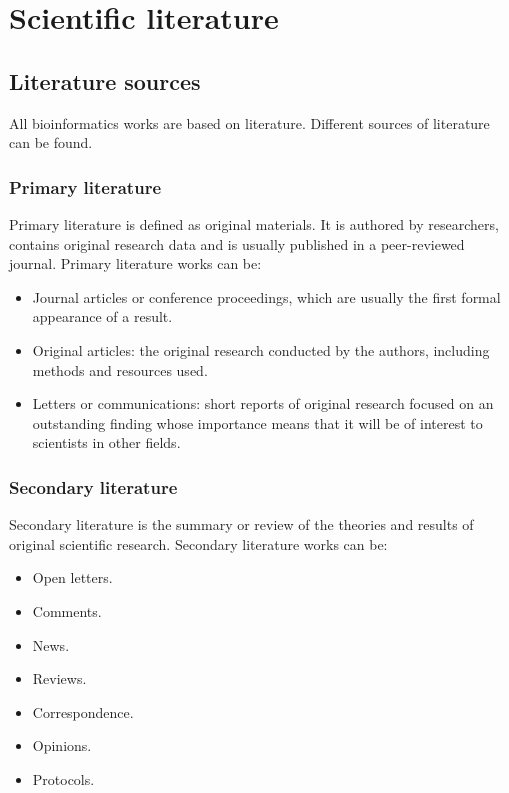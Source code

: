 \graphicspath{{chapters/02/images}}
\chapter{Scientific literature}

\section{Literature sources}
All bioinformatics works are based on literature.
Different sources of literature can be found.

	\subsection{Primary literature}
	Primary literature is defined as original materials.
	It is authored by researchers, contains original research data and is usually published in a peer-reviewed journal.
	Primary literature works can be:

	\begin{multicols}{2}
		\begin{itemize}
			\item Journal articles or conference proceedings, which are usually the first formal appearance of a result.
			\item Original articles: the original research conducted by the authors, including methods and resources used.
			\item Letters or communications: short reports of original research focused on an outstanding finding whose importance means that it will be of interest to scientists in other fields.
		\end{itemize}
	\end{multicols}

	\subsection{Secondary literature}
	Secondary literature is the summary or review of the theories and results of original scientific research.
	Secondary literature works can be:

	\begin{multicols}{4}
		\begin{itemize}
			\item Open letters.
			\item Comments.
			\item News.
			\item Reviews.
			\item Correspondence.
			\item Opinions.
			\item Protocols.
		\end{itemize}
	\end{multicols}

